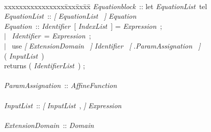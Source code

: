 \documentclass[12pt]{article}
\newcommand{\Opt}[1]{{\rm\sl [} #1 {\rm\sl ]}}
\newcommand{\Alt}{$\mid$}
\newcommand{\EquationBlock}{{\sl Equationblock\ }}
\newcommand{\Domain}{{\sl Domain\ }}
\newcommand{\IdentifierList}{{\sl IdentifierList\ }}
\newcommand{\Identifier}{{\sl Identifier\ }}
\newcommand{\IndexList}{{\sl IndexList\ }}
\newcommand{\AffineFunction}{{\sl AffineFunction\ }}
\newcommand{\EquationList}{{\sl EquationList\ }}
\newcommand{\Equation}{{\sl Equation\ }}
\newcommand{\ParamAssignation}{{\sl ParamAssignation\ }}
\newcommand{\InputList}{{\sl InputList\ }}
\newcommand{\ExtensionDomain}{{\sl ExtensionDomain\ }}
\newcommand{\Expression}{{\sl Expression\ }}
\begin{document}
{\tt
\begin{tabbing}
xxxxxxxxxxxxxxxx\= xxx\= xx\=  xx\= \kill
\EquationBlock \>::\>\> let \EquationList tel \\
\EquationList  \>::\>\> \Opt{ \EquationList } \Equation\\
\Equation\>::\>\> \Identifier [ \IndexList ] = \Expression ;\\
\>\> \Alt\ \> \Identifier = \Expression ;\\
\>\> \Alt\ \> use \Opt{ \ExtensionDomain} \Identifier
                                    \Opt{.\ParamAssignation} \\
\>\>\>\>( \InputList )\\
\>\>\>\> returns ( \IdentifierList ) ;\\
\\
\ParamAssignation \>::\>\> \AffineFunction \\
\\
\InputList \>::\>\> \Opt{ \InputList , } \Expression\\
\\
\ExtensionDomain \>::\>\> \Domain \\
\end{tabbing}
}
\end{document}
